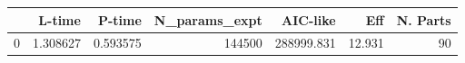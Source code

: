 \begin{tabular}{lrrrrrr}
\toprule
{} &    L-time &    P-time &  N\_params\_expt &    AIC-like &     Eff &  N. Parts \\
\midrule
0 &  1.308627 &  0.593575 &         144500 &  288999.831 &  12.931 &        90 \\
\bottomrule
\end{tabular}
